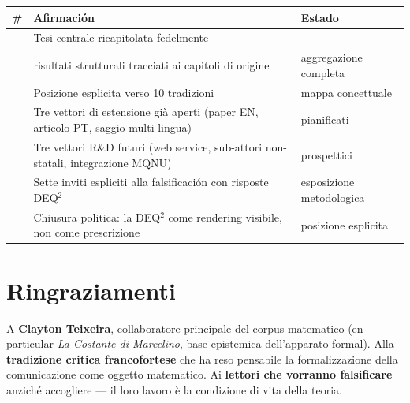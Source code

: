 {\def\LTcaptype{none} %
{\small\begin{longtable}[]{@{}
  >{\raggedright\arraybackslash}p{}
  >{\raggedright\arraybackslash}p{}
  >{\raggedright\arraybackslash}p{}@{}}
\toprule\noalign{}
\begin{minipage}[b]{\linewidth}\raggedright
\#
\end{minipage} & \begin{minipage}[b]{\linewidth}\raggedright
Afirmación
\end{minipage} & \begin{minipage}[b]{\linewidth}\raggedright
Estado
\end{minipage} \\
\midrule\noalign{}
\endhead
\bottomrule\noalign{}
\endlastfoot
1 & Tesi centrale ricapitolata fedelmente & \Proved{} \\
2 & 21 risultati strutturali tracciati ai capitoli di origine &
\Proved{} aggregazione completa \\
3 & Posizione esplicita verso 10 tradizioni & \Hypoth{} mappa
concettuale \\
4 & Tre vettori di estensione già aperti (paper EN, articolo PT, saggio
multi-lingua) & \Proved{} pianificati \\
5 & Tre vettori R\&D futuri (web service, sub-attori non-statali,
integrazione MQNU) & \Conj{} prospettici \\
6 & Sette inviti espliciti alla falsificación con risposte DEQ$^2$ &
\Hypoth{} esposizione metodologica \\
7 & Chiusura politica: la DEQ$^2$ come rendering visibile, non come
prescrizione & \Hypoth{} posizione esplicita \\
\end{longtable}}
}



\section{Ringraziamenti}\label{ringraziamenti}

A \textbf{Clayton Teixeira}, collaboratore principale del corpus
matematico (en particular \emph{La Costante di Marcelino}, base
epistemica dell'apparato formal). Alla \textbf{tradizione critica
francofortese} che ha reso pensabile la formalizzazione della
comunicazione come oggetto matematico. Ai \textbf{lettori che vorranno
falsificare} anziché accogliere --- il loro lavoro è la condizione di
vita della teoria.


